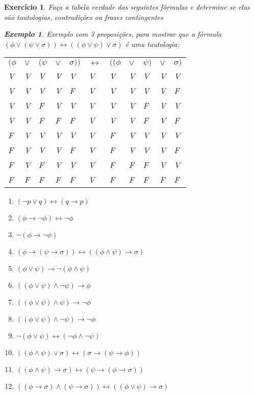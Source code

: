 \documentclass[a4paper,10pt]{article}
\newtheorem{exrcc}{Exercício}[subsection] %
\newtheorem{exmpl}{Exemplo}[subsection] %
\begin{document}
\begin{exrcc}
Faça a tabela verdade das seguintes fórmulas e determine se elas são tautologias,
contradições ou frases contingentes
\label{tabvcompl}


\begin{exmpl}
Exemplo com 3 proposições, para mostrar que a fórmula
$(\phi\vee(\psi\vee\sigma))\leftrightarrow((\phi\vee\psi)\vee\sigma)$ é uma tautologia:

\begin{center}
\begin{tabular}[c]{lllllllllll}
$(\phi$ & $\vee$ & $(\psi$ & $\vee$ & $\sigma))$ & $\leftrightarrow$ & $((\phi$ & $\vee$
& $\psi)$ & $\vee$ & $\sigma)$ \\
V & V & V & V & V & V & V & V & V & V & V \\ 
V & V & V & V & F & V & V & V & V & V & F \\ 
V & V & F & V & V & V & V & V & F & V & V \\ 
V & V & F & F & F & V & V & V & F & V & F \\ 
F & V & V & V & V & V & F & V & V & V & V \\ 
F & V & V & V & F & V & F & V & V & V & F \\ 
F & V & F & V & V & V & F & F & F & V & V \\ 
F & F & F & F & F & V & F & F & F & F & F
\end{tabular}
\end{center}
\end{exmpl}


\begin{enumerate}
\setlength{\itemsep}{0pt}
 \item $(\neg{}p\vee{}q)\leftrightarrow(q\rightarrow{}p)$
 \item $(\phi\rightarrow\neg\phi)\leftrightarrow\neg\phi$
 \item $\neg(\phi\rightarrow\neg\phi)$
 \item
$(\phi\rightarrow(\psi\rightarrow\sigma))\leftrightarrow((\phi\wedge\psi)\rightarrow
\sigma)$
\item $(\phi\vee\psi)\rightarrow\neg(\phi\wedge\psi)$
\item $((\phi\vee\psi)\wedge\neg\psi)\rightarrow\phi$
\item $((\phi\vee\psi)\wedge\psi)\rightarrow\neg\phi$
\item $((\phi\vee\psi)\wedge\neg\psi)\rightarrow\neg\phi$
\item $\neg(\phi\vee\psi)\leftrightarrow(\neg\phi\wedge\neg\psi)$
\item
$((\phi\wedge\psi)\vee\sigma)\leftrightarrow(\sigma\rightarrow(\psi\rightarrow\phi))$
\item
$((\phi\wedge\psi)\rightarrow\sigma)\leftrightarrow(\psi\rightarrow(\phi\rightarrow
\sigma))$
\item
$((\phi\rightarrow\sigma)\wedge(\psi\rightarrow\sigma))\leftrightarrow((\phi\vee\psi)
\rightarrow\sigma)$
\end{enumerate}
\end{exrcc}
\end{document}
